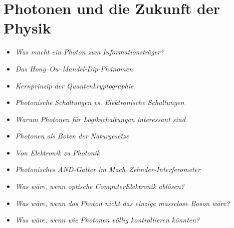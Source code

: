 \section{Photonen und die Zukunft der Physik}
\vspace{1em}
\begin{tcolorbox}[title=physikalische Boxen, physikbox]
	\begin{itemize}
		\item \emph{Was macht ein Photon zum Informationsträger?} \dotfill\pageref{box:photon_information}
		\item \emph{Das Hong–Ou–Mandel-Dip-Phänomen} \dotfill\pageref{box:hong_ou_mandel}
		\item \emph{Kernprinzip der Quantenkryptographie} \dotfill\pageref{box:qcrypto_prinzip}
		\item \emph{Photonische Schaltungen vs. Elektronische \newline Schaltungen} \dotfill\pageref{box:photon_vs_electron}
		\item \emph{Warum Photonen für Logikschaltungen \newline interessant sind}\dotfill\pageref{box:optlogik_vorteile}
		\item \emph{Photonen als Boten der Naturgesetze} \dotfill\pageref{box:photonen_grundlagen}
	\end{itemize}
\end{tcolorbox}

\vspace{1em}
\begin{tcolorbox}[title=didaktische Boxen, didaktikbox]
	\begin{itemize}
		\item \emph{Von Elektronik zu Photonik} \dotfill\pageref{box:optlogik_didaktik}
		\item \emph{Photonisches AND-Gatter im \newline Mach--Zehnder-Interferometer} \dotfill\pageref{box:mzi_and}
	\end{itemize}
\end{tcolorbox}

\vspace{1em}
\begin{tcolorbox}[title=hypothetische Boxen, hypobox]
	\begin{itemize}
		\item \emph{Was wäre, wenn optische Computer\newline  Elektronik ablösen?}\dotfill\pageref{box:optlogik_zukunft}
		\item \emph{Was wäre, wenn das Photon nicht das einzige \newline masselose Boson wäre?} \dotfill\pageref{box:photon_neue_physik}
		\item \emph{Was wäre, wenn wie Photonen völlig \newline kontrollieren könnten?} \dotfill\pageref{box:hypo_kapVII}
	\end{itemize}
\end{tcolorbox}

